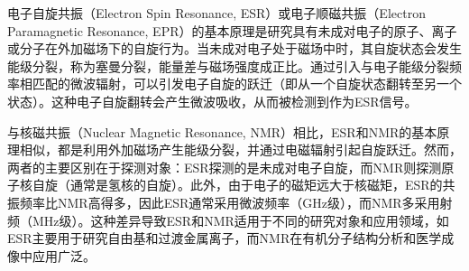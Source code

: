 \documentclass[dvipsnames, svgnames,a4paper,11pt]{article}
\begin{document}



	
电子自旋共振（Electron Spin Resonance, ESR）或电子顺磁共振（Electron Paramagnetic Resonance, EPR）的基本原理是研究具有未成对电子的原子、离子或分子在外加磁场下的自旋行为。当未成对电子处于磁场中时，其自旋状态会发生能级分裂，称为塞曼分裂，能量差与磁场强度成正比。通过引入与电子能级分裂频率相匹配的微波辐射，可以引发电子自旋的跃迁（即从一个自旋状态翻转至另一个状态）。这种电子自旋翻转会产生微波吸收，从而被检测到作为ESR信号。

与核磁共振（Nuclear Magnetic Resonance, NMR）相比，ESR和NMR的基本原理相似，都是利用外加磁场产生能级分裂，并通过电磁辐射引起自旋跃迁。然而，两者的主要区别在于探测对象：ESR探测的是未成对电子自旋，而NMR则探测原子核自旋（通常是氢核的自旋）。此外，由于电子的磁矩远大于核磁矩，ESR的共振频率比NMR高得多，因此ESR通常采用微波频率（GHz级），而NMR多采用射频（MHz级）。这种差异导致ESR和NMR适用于不同的研究对象和应用领域，如ESR主要用于研究自由基和过渡金属离子，而NMR在有机分子结构分析和医学成像中应用广泛。
\end{document}
